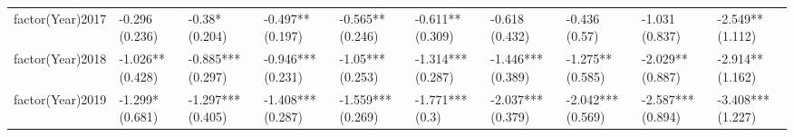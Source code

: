 \begin{table}[ht]
\begin{tabular}{llllllllll}
  factor(Year)2017 & -0.296 (0.236) & -0.38* (0.204) & -0.497** (0.197) & -0.565** (0.246) & -0.611** (0.309) & -0.618 (0.432) & -0.436 (0.57) & -1.031 (0.837) & -2.549** (1.112) \\ 
  factor(Year)2018 & -1.026** (0.428) & -0.885*** (0.297) & -0.946*** (0.231) & -1.05*** (0.253) & -1.314*** (0.287) & -1.446*** (0.389) & -1.275** (0.585) & -2.029** (0.887) & -2.914** (1.162) \\ 
  factor(Year)2019 & -1.299* (0.681) & -1.297*** (0.405) & -1.408*** (0.287) & -1.559*** (0.269) & -1.771*** (0.3) & -2.037*** (0.379) & -2.042*** (0.569) & -2.587*** (0.894) & -3.408*** (1.227) \\ 
   \bottomrule
\end{tabular}
\endgroup
\end{table}

